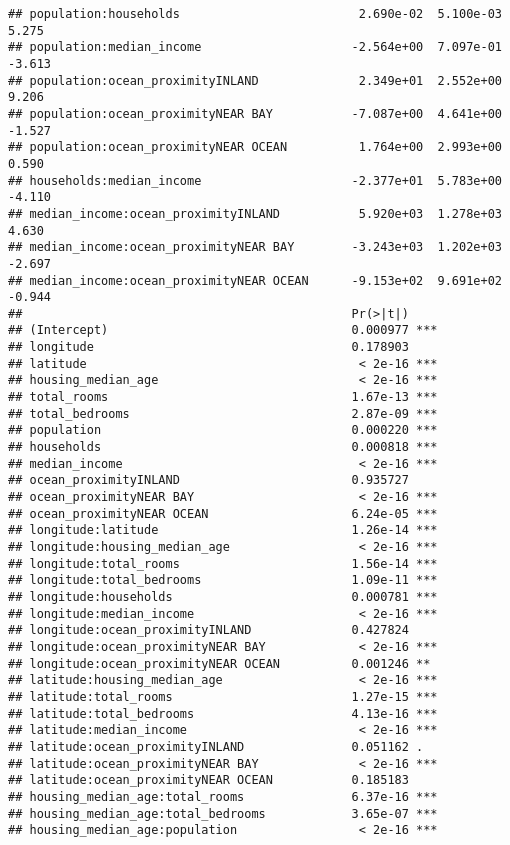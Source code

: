 \documentclass[
]{article}
\begin{document}
\begin{verbatim}
## population:households                         2.690e-02  5.100e-03   5.275
## population:median_income                     -2.564e+00  7.097e-01  -3.613
## population:ocean_proximityINLAND              2.349e+01  2.552e+00   9.206
## population:ocean_proximityNEAR BAY           -7.087e+00  4.641e+00  -1.527
## population:ocean_proximityNEAR OCEAN          1.764e+00  2.993e+00   0.590
## households:median_income                     -2.377e+01  5.783e+00  -4.110
## median_income:ocean_proximityINLAND           5.920e+03  1.278e+03   4.630
## median_income:ocean_proximityNEAR BAY        -3.243e+03  1.202e+03  -2.697
## median_income:ocean_proximityNEAR OCEAN      -9.153e+02  9.691e+02  -0.944
##                                              Pr(>|t|)    
## (Intercept)                                  0.000977 ***
## longitude                                    0.178903    
## latitude                                      < 2e-16 ***
## housing_median_age                            < 2e-16 ***
## total_rooms                                  1.67e-13 ***
## total_bedrooms                               2.87e-09 ***
## population                                   0.000220 ***
## households                                   0.000818 ***
## median_income                                 < 2e-16 ***
## ocean_proximityINLAND                        0.935727    
## ocean_proximityNEAR BAY                       < 2e-16 ***
## ocean_proximityNEAR OCEAN                    6.24e-05 ***
## longitude:latitude                           1.26e-14 ***
## longitude:housing_median_age                  < 2e-16 ***
## longitude:total_rooms                        1.56e-14 ***
## longitude:total_bedrooms                     1.09e-11 ***
## longitude:households                         0.000781 ***
## longitude:median_income                       < 2e-16 ***
## longitude:ocean_proximityINLAND              0.427824    
## longitude:ocean_proximityNEAR BAY             < 2e-16 ***
## longitude:ocean_proximityNEAR OCEAN          0.001246 ** 
## latitude:housing_median_age                   < 2e-16 ***
## latitude:total_rooms                         1.27e-15 ***
## latitude:total_bedrooms                      4.13e-16 ***
## latitude:median_income                        < 2e-16 ***
## latitude:ocean_proximityINLAND               0.051162 .  
## latitude:ocean_proximityNEAR BAY              < 2e-16 ***
## latitude:ocean_proximityNEAR OCEAN           0.185183    
## housing_median_age:total_rooms               6.37e-16 ***
## housing_median_age:total_bedrooms            3.65e-07 ***
## housing_median_age:population                 < 2e-16 ***

\end{verbatim}
\end{document}
